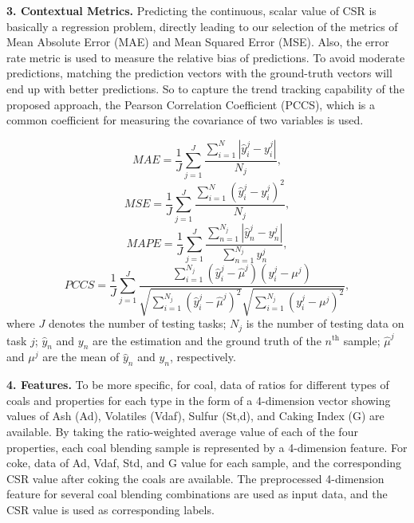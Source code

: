 \textbf{3. Contextual Metrics.} 
Predicting the continuous, scalar value of CSR is basically a regression problem, directly leading to our selection of the metrics of Mean Absolute Error (MAE) and Mean Squared Error (MSE). Also, the error rate metric is used to measure the relative bias of predictions. 
To avoid moderate predictions, matching the prediction vectors with the ground-truth vectors will end up with better predictions.
So to capture the trend tracking capability of the proposed approach, the Pearson Correlation Coefficient (PCCS), which is a common coefficient for measuring the covariance of two variables is used.

\begin{equation} \label{equ:mae} 
MAE = \frac{1}{J} \sum^J_{j=1} \frac{\sum_{i=1}^N |\hat{y}^{j}_{i} - y^{j}_{i}|}{N_j}, 
\end{equation}
\begin{equation} \label{equ:mse} 
MSE = \frac{1}{J} \sum^J_{j=1} \frac{\sum_{i=1}^N (\hat{y}^{j}_{i} - y^{j}_{i})^2}{N_j},
\end{equation}
\begin{equation} \label{equ:er} 
MAPE = \frac{1}{J} \sum^J_{j=1} \frac{\sum_{n=1}^{N_j} |\hat{y}^j_n - y^j_n|}{\sum_{n=1}^{N_j} y^j_n}, 
\end{equation}
\begin{equation} \label{equ:pccs} 
PCCS = \frac{1}{J} \sum^J_{j=1} \frac{\sum_{i=1}^{N_j} (\hat{y}^{j}_{i} - \hat{\mu}^j)(y^{j}_{i} - \mu^j)}{\sqrt{\sum_{i=1}^{N_j} (\hat{y}^{j}_{i} - \hat{\mu}^j)^2}\sqrt{\sum_{i=1}^{N_j}(y^{j}_{i} - \mu^j)^2}},
\end{equation}
where $J$ denotes the number of testing tasks; $N_j$ is the number of testing data on task $j$; $\hat{y}_n$ and $y_n$ are the estimation and the ground truth of the $n^\text{th}$ sample; $\hat{\mu}^j$ and $\mu^j$ are the mean of $\hat{y}_n$ and $y_n$, respectively.

\textbf{4. Features.}
To be more specific, for coal, data of ratios for different types of coals and properties for each type in the form of a 4-dimension vector showing values of Ash (Ad), Volatiles (Vdaf), Sulfur (St,d), and Caking Index (G) are available. By taking the ratio-weighted average value of each of the four properties, each coal blending sample is represented by a 4-dimension feature. For coke, data of Ad, Vdaf, Std, and G value for each sample, and the corresponding CSR value after coking the coals are available. The preprocessed 4-dimension feature for several coal blending combinations are used as input data, and the CSR value is used as corresponding labels. 

